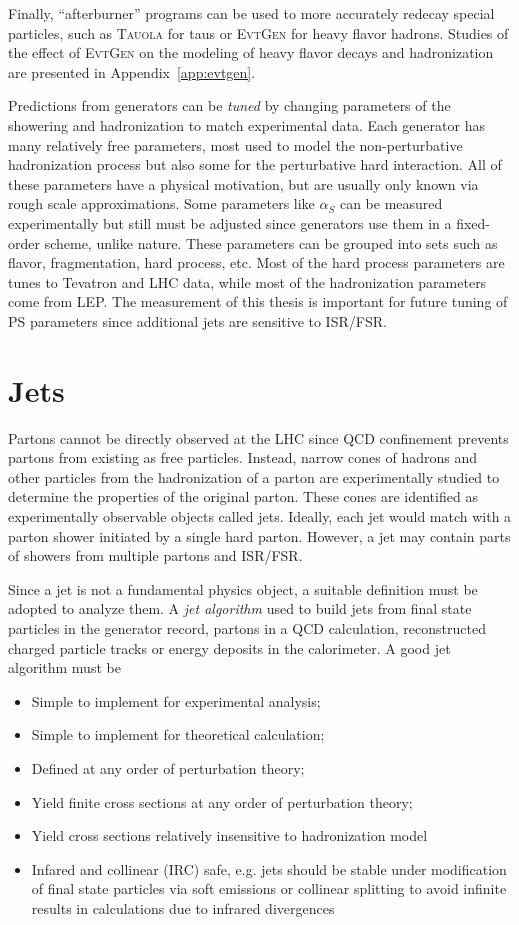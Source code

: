 Finally, ``afterburner'' programs can be used to more accurately redecay special particles, such as \textsc{Tauola} for taus\cite{Jadach:1993hs} or \textsc{EvtGen} for heavy flavor hadrons\cite{Lange:2001uf}. Studies of the effect of \textsc{EvtGen} on the modeling of heavy flavor decays and hadronization are presented in Appendix~\ref{app:evtgen}.

Predictions from generators can be \emph{tuned} by changing parameters of the showering and hadronization to match experimental data\cite{Buckley:2009vk}. Each generator has many relatively free parameters, most used to model the non-perturbative hadronization process but also some for the perturbative hard interaction. All of these parameters have a physical motivation, but are usually only known via rough scale approximations. Some parameters like $\alpha_S$ can be measured experimentally but still must be adjusted since generators use them in a fixed-order scheme, unlike nature. These parameters can be grouped into sets such as flavor, fragmentation, hard process, etc. Most of the hard process parameters are tunes to Tevatron and LHC data, while most of the hadronization parameters come from LEP. The measurement of this thesis is important for future tuning of PS parameters since additional jets are sensitive to ISR/FSR.

\section{Jets}
Partons cannot be directly observed at the LHC since QCD confinement prevents partons from existing as free particles. Instead, narrow cones of hadrons and other particles from the hadronization of a parton are experimentally studied to determine the properties of the original parton. These cones are identified as experimentally observable objects called jets. Ideally, each jet would match with a parton shower initiated by a single hard parton. However, a jet may contain parts of showers from multiple partons and ISR/FSR. 

Since a jet is not a fundamental physics object, a suitable definition must be adopted to analyze them. A \emph{jet algorithm} used to build jets from final state particles in the generator record, partons in a QCD calculation, reconstructed charged particle tracks or energy deposits in the calorimeter. A good jet algorithm must be~\cite{Atkin:2015msa}
\begin{itemize}
\item Simple to implement for experimental analysis;
\item Simple to implement for theoretical calculation;
\item Defined at any order of perturbation theory;
\item Yield finite cross sections at any order of perturbation theory;
\item Yield cross sections relatively insensitive to hadronization model
\item Infared and collinear (IRC) safe, e.g. jets should be stable under modification of final state particles via soft emissions or collinear splitting to avoid infinite results in calculations due to infrared divergences
\end{itemize}

